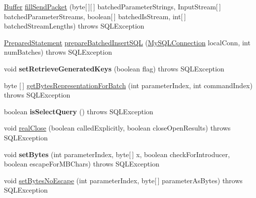 \begin{DoxyCompactItemize}
\item 
\mbox{\hyperlink{classcom_1_1mysql_1_1jdbc_1_1_buffer}{Buffer}} \mbox{\hyperlink{classcom_1_1mysql_1_1jdbc_1_1_prepared_statement_a7012604554fada055dce8c36ece28ac7}{fill\+Send\+Packet}} (byte\mbox{[}$\,$\mbox{]}\mbox{[}$\,$\mbox{]} batched\+Parameter\+Strings, Input\+Stream\mbox{[}$\,$\mbox{]} batched\+Parameter\+Streams, boolean\mbox{[}$\,$\mbox{]} batched\+Is\+Stream, int\mbox{[}$\,$\mbox{]} batched\+Stream\+Lengths)  throws S\+Q\+L\+Exception 
\item 
\mbox{\hyperlink{classcom_1_1mysql_1_1jdbc_1_1_prepared_statement}{Prepared\+Statement}} \mbox{\hyperlink{classcom_1_1mysql_1_1jdbc_1_1_prepared_statement_ad039caba8bbe065bb7b6a26a0f7a1f30}{prepare\+Batched\+Insert\+S\+QL}} (\mbox{\hyperlink{interfacecom_1_1mysql_1_1jdbc_1_1_my_s_q_l_connection}{My\+S\+Q\+L\+Connection}} local\+Conn, int num\+Batches)  throws S\+Q\+L\+Exception 
\item 
\mbox{\label{classcom_1_1mysql_1_1jdbc_1_1_prepared_statement_a726fdf5ea37ab78ff534b948880a6afe}} 
void {\bfseries set\+Retrieve\+Generated\+Keys} (boolean flag)  throws S\+Q\+L\+Exception 
\item 
byte \mbox{[}$\,$\mbox{]} \mbox{\hyperlink{classcom_1_1mysql_1_1jdbc_1_1_prepared_statement_a7fd98fc094ff75e0c2cacedb818f236e}{get\+Bytes\+Representation\+For\+Batch}} (int parameter\+Index, int command\+Index)  throws S\+Q\+L\+Exception 
\item 
\mbox{\label{classcom_1_1mysql_1_1jdbc_1_1_prepared_statement_a27509d993b66a5a3b78d148e9550f63b}} 
boolean {\bfseries is\+Select\+Query} ()  throws S\+Q\+L\+Exception 
\item 
void \mbox{\hyperlink{classcom_1_1mysql_1_1jdbc_1_1_prepared_statement_a20c0c136d44994a292aecb75b10b4133}{real\+Close}} (boolean called\+Explicitly, boolean close\+Open\+Results)  throws S\+Q\+L\+Exception 
\item 
\mbox{\label{classcom_1_1mysql_1_1jdbc_1_1_prepared_statement_a56440753fcaad792f039ac1a7ae19ff8}} 
void {\bfseries set\+Bytes} (int parameter\+Index, byte\mbox{[}$\,$\mbox{]} x, boolean check\+For\+Introducer, boolean escape\+For\+M\+B\+Chars)  throws S\+Q\+L\+Exception 
\item 
void \mbox{\hyperlink{classcom_1_1mysql_1_1jdbc_1_1_prepared_statement_ae6f08c22768c05382f813b02cfdb81e8}{set\+Bytes\+No\+Escape}} (int parameter\+Index, byte\mbox{[}$\,$\mbox{]} parameter\+As\+Bytes)  throws S\+Q\+L\+Exception 

\end{DoxyCompactItemize}
